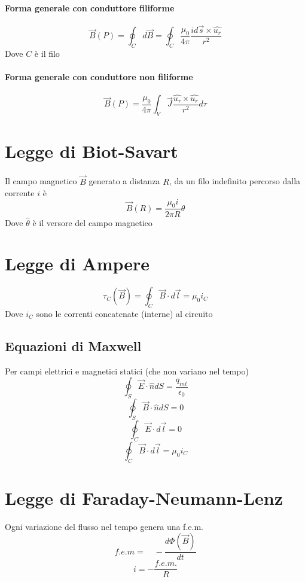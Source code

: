 \documentclass[a4paper]{report}
\begin{document}
  \paragraph{Forma generale con conduttore filiforme}
  $$ \vec{B}(P) = \oint_C d\vec{B} = \oint_C \frac{\mu_0}{4\pi} \frac{id\vec{s} \times \hat{u_r}}{r^2}$$
  Dove $C$ è il filo
  \paragraph{Forma generale con conduttore non filiforme}
  $$ \vec{B}(P) = \frac{\mu_0}{4\pi} \int_V \vec{J}\frac{\hat{u_\tau} \times \hat{u_r}}{r^2} d\tau $$

  \section{Legge di Biot-Savart}
  Il campo magnetico $\vec{B}$ generato a distanza $R$, da un filo indefinito percorso dalla corrente $i$ è
  $$ \vec{B}(R) = \frac{\mu_0 i}{2 \pi R} \hat{\theta} $$
  Dove $\hat{\theta}$ è il versore del campo magnetico

  \section{Legge di Ampere}
  $$ \tau_C (\vec{B}) = \oint_C \vec{B} \cdot d\vec{l} = \mu_0 i_C $$
  Dove $i_C$ sono le correnti concatenate (interne) al circuito

  \subsection{Equazioni di Maxwell}
  Per campi elettrici e magnetici statici (che non variano nel tempo)
  $$ \oint_S \vec{E}\cdot \hat{n} dS = \frac{q_{int}}{\epsilon_0} $$
  $$ \oint_S \vec{B}\cdot \hat{n} dS = 0 $$
  $$ \oint_C \vec{E}\cdot d\vec{l} = 0 $$
  $$ \oint_C \vec{B} \cdot d\vec{l} = \mu_0 i_C $$

  \section{Legge di Faraday-Neumann-Lenz}
  Ogni variazione del flusso nel tempo genera una f.e.m.
  $$f.e.m = \quad -\frac{d\Phi(\vec{B})}{dt} $$
  $$ i = -\frac{f.e.m.}{R} $$
\end{document}
